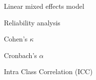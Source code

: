 \documentclass[9pt,ignorenonframetext,xcolor=dvipsnames]{beamer}
\begin{document}
\begin{frame}{Linear mixed effects model}

\end{frame}

\begin{frame}{Reliability analysis}

\begin{block}{Cohen's \(\kappa\)}

\end{block}

\begin{block}{Cronbach's \(\alpha\)}

\end{block}

\begin{block}{Intra Class Correlation (ICC)}

\end{block}

\end{frame}
\end{document}
